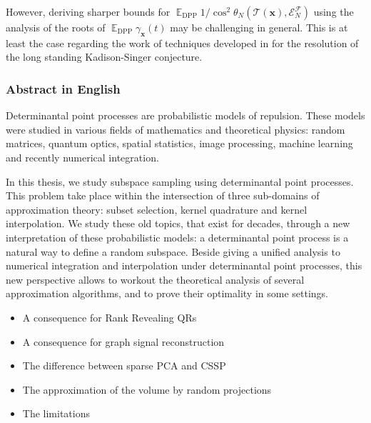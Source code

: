 \documentclass[twoside,11pt]{book}
\numberwithin{theorem}{chapter}
\numberwithin{definition}{chapter}
\numberwithin{proposition}{chapter}
\numberwithin{corollary}{chapter}
\numberwithin{example}{chapter}
\numberwithin{lemma}{chapter}
\numberwithin{assumption}{chapter}
\numberwithin{equation}{chapter}
\numberwithin{figure}{chapter}
\DeclareMathOperator{\DPP}{\mathrm{DPP}}
\DeclareMathOperator{\EX}{\mathbb{E}}
\DeclareMathOperator{\F}{\mathcal{F}}
\begin{document}
However, deriving sharper bounds for $\EX_{\DPP}1 \big/ \cos^{2}\theta_{N}(\mathcal{T}(\bm{x}), \mathcal{E}_{N}^{\F})$ using the analysis of the roots of $\EX_{\DPP} \gamma_{\bm{x}}(t)$ may be challenging in general. This is at least the case regarding the work of techniques developed in \citep*{MaSpSr15} for the resolution of the long standing Kadison-Singer conjecture. 







\subsubsection{Abstract in English}

Determinantal point processes are probabilistic models of repulsion. 
These models were studied in various fields of mathematics and theoretical physics: random matrices, quantum optics, spatial statistics, image processing, machine learning and recently numerical integration.

In this thesis, we study subspace sampling using determinantal point processes. This problem take place within the intersection of three sub-domains of approximation theory: subset selection, kernel quadrature and kernel interpolation. We study these old topics, that exist for decades, through a new interpretation of these probabilistic models: a determinantal point process is a natural way to define a random  subspace. Beside giving a unified analysis to numerical integration and interpolation under determinantal point processes, this new perspective allows to workout the theoretical analysis of several approximation algorithms, and to prove their optimality in some settings. 






\clearpage





\begin{itemize}
\item A consequence for Rank Revealing QRs
\item A consequence for graph signal reconstruction
\item The difference between sparse PCA and CSSP
\item The approximation of the volume by random projections
\item The limitations  
\end{itemize}
\end{document}
